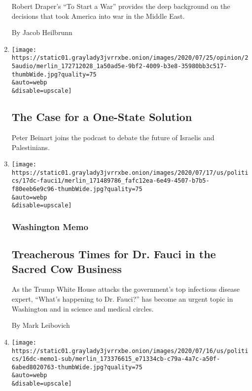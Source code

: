 \begin{enumerate}
  Robert Draper's ``To Start a War'' provides the deep background on the
  decisions that took America into war in the Middle East.

  By Jacob Heilbrunn
\item
  \href{/2020/07/23/opinion/the-argument-israel-palestinian.html}{}

  \texttt{[image: https://static01.graylady3jvrrxbe.onion/images/2020/07/25/opinion/25audio/merlin\_172712028\_1a50ad5e-9bf2-4009-b3e8-35980bb3c517-thumbWide.jpg?quality=75\\\&auto=webp\\\&disable=upscale]}

  \hypertarget{the-case-for-a-one-state-solution}{%
  \subsection{The Case for a One-State
  Solution}\label{the-case-for-a-one-state-solution}}

  Peter Beinart joins the podcast to debate the future of Israelis and
  Palestinians.
\item
  \href{/2020/07/17/us/fauci-trump.html}{}

  \texttt{[image: https://static01.graylady3jvrrxbe.onion/images/2020/07/17/us/politics/17dc-fauci1/merlin\_171489786\_fafc12ea-6e49-4507-b7b5-f80eeb6e9c96-thumbWide.jpg?quality=75\\\&auto=webp\\\&disable=upscale]}

  \hypertarget{washington-memo}{%
  \subsubsection{Washington Memo}\label{washington-memo}}

  \hypertarget{treacherous-times-for-dr-fauci-in-the-sacred-cow-business}{%
  \subsection{Treacherous Times for Dr. Fauci in the Sacred Cow
  Business}\label{treacherous-times-for-dr-fauci-in-the-sacred-cow-business}}

  As the Trump White House attacks the government's top infectious
  disease expert, ``What's happening to Dr. Fauci?'' has become an
  urgent topic in Washington and in science and medical circles.

  By Mark Leibovich
\item
  \href{/2020/07/16/us/politics/trump-republicans.html}{}

  \texttt{[image: https://static01.graylady3jvrrxbe.onion/images/2020/07/16/us/politics/16dc-memo1-sub/merlin\_173376615\_e71334cb-c79a-4a7c-a50f-6abed8020763-thumbWide.jpg?quality=75\\\&auto=webp\\\&disable=upscale]}


\end{enumerate}
